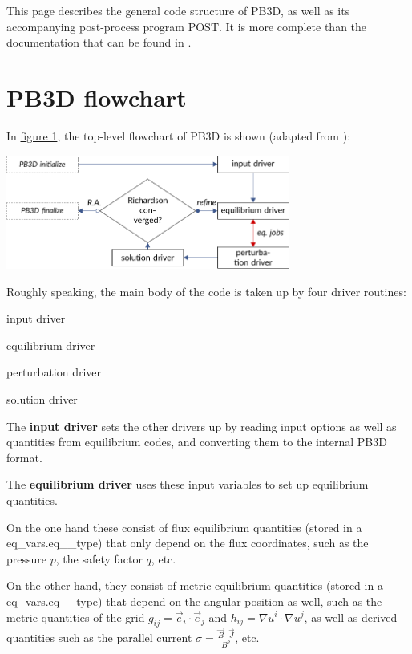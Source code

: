 This page describes the general code structure of P\+B3D, as well as its accompanying post-\/process program P\+O\+ST. It is more complete than the documentation that can be found in \cite{Weyens2017PB3D}.\hypertarget{page_overview_overview_PB3D_flowchart}{}\section{P\+B3\+D flowchart}\label{page_overview_overview_PB3D_flowchart}
In \hyperlink{page_overview_flowchart_fig}{figure 1}, the top-\/level flowchart of P\+B3D is shown (adapted from \cite{Weyens2017PB3D})\+:

\label{page_overview_flowchart_fig}%
%
 
\begin{DoxyImage}
\includegraphics[width=0.7\textwidth]{flowchart}
\end{DoxyImage}


Roughly speaking, the main body of the code is taken up by four driver routines\+:
\begin{DoxyItemize}
\item input driver
\item equilibrium driver
\item perturbation driver
\item solution driver
\end{DoxyItemize}

The {\bfseries input driver} sets the other drivers up by reading input options as well as quantities from equilibrium codes, and converting them to the internal P\+B3D format.

The {\bfseries equilibrium driver} uses these input variables to set up equilibrium quantities.
\begin{DoxyItemize}
\item On the one hand these consist of flux equilibrium quantities (stored in a eq\+\_\+vars.\+eq\+\_\+\_\+type) that only depend on the flux coordinates, such as the pressure $p$, the safety factor $q$, etc.
\item On the other hand, they consist of metric equilibrium quantities (stored in a eq\+\_\+vars.\+eq\+\_\+\_\+type) that depend on the angular position as well, such as the metric quantities of the grid $g_{ij} = \vec{e}_i \cdot \vec{e}_j$ and $h_{ij} = \nabla u^i \cdot \nabla u^j$, as well as derived quantities such as the parallel current $\sigma = \frac{\vec{B}\cdot\vec{J}}{B^2}$, etc. \cite{weyens2014theory}
\end{DoxyItemize}

